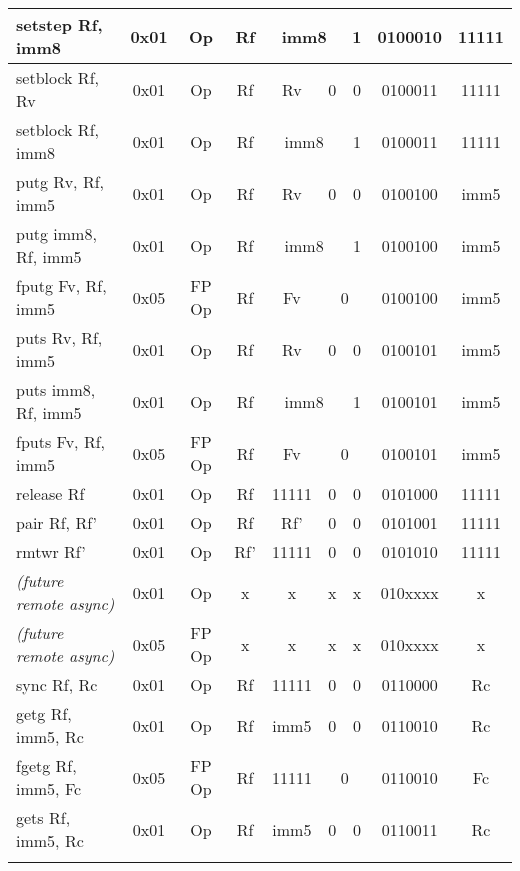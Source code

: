 \documentclass[a4paper,11pt]{article}
\begin{document}
\begin{table}
\begin{center}
{\begin{tabular}{|>{\ttfamily}l||c|c|c|c|c|c|c|c|}
setstep  Rf, imm8       & 0x01 & Op     & Rf & \multicolumn{2}{c|}{imm8} & 1 & 0100010 & 11111 \\ \cline{5-6}
setblock Rf, Rv         & 0x01 & Op     & Rf &                    Rv & 0 & 0 & 0100011 & 11111 \\ \cline{5-6}
setblock Rf, imm8       & 0x01 & Op     & Rf & \multicolumn{2}{c|}{imm8} & 1 & 0100011 & 11111 \\ \cline{5-6}
putg Rv, Rf, imm5       & 0x01 & Op     & Rf &                    Rv & 0 & 0 & 0100100 & imm5 \\ \cline{5-6}
putg imm8, Rf, imm5     & 0x01 & Op     & Rf & \multicolumn{2}{c|}{imm8} & 1 & 0100100 & imm5 \\ \cline{5-7}
fputg Fv, Rf, imm5      & 0x05 & FP Op  & Rf & Fv & \multicolumn{2}{c|}{0} & 0100100 & imm5 \\ \cline{5-7}
puts Rv, Rf, imm5       & 0x01 & Op     & Rf &                    Rv & 0 & 0 & 0100101 & imm5 \\ \cline{5-6}
puts imm8, Rf, imm5     & 0x01 & Op     & Rf & \multicolumn{2}{c|}{imm8} & 1 & 0100101 & imm5 \\ \cline{5-7}
fputs Fv, Rf, imm5      & 0x05 & FP Op  & Rf & Fv & \multicolumn{2}{c|}{0} & 0100101 & imm5 \\ \cline{6-7}
release  Rf             & 0x01 & Op     & Rf &                    11111 & 0 & 0 & 0101000 & 11111 \\
pair  Rf, Rf'             & 0x01 & Op     & Rf &                    Rf'     & 0 & 0 & 0101001 & 11111 \\
rmtwr  Rf'               & 0x01 & Op     & Rf' &                    11111 & 0 & 0 & 0101010 & 11111 \\
\hline\hline
\normalfont \emph{(future remote async)} & 0x01 & Op & x & x & x & x & 010xxxx & x \\
\normalfont \emph{(future remote async)} & 0x05 & FP Op & x & x & x & x & 010xxxx & x \\
\hline \hline
sync Rf, Rc             & 0x01 & Op     & Rf &                    11111 & 0 & 0 & 0110000 & Rc \\
getg Rf, imm5, Rc       & 0x01 & Op     & Rf &                  imm5 & 0 & 0 & 0110010 & Rc \\ \cline{6-7}
fgetg  Rf, imm5, Fc     & 0x05 & FP Op  & Rf & 11111 & \multicolumn{2}{c|}{0} &   0110010 & Fc \\ \cline{6-7}
gets Rf, imm5, Rc       & 0x01 & Op     & Rf &                  imm5 & 0 & 0 & 0110011 & Rc \\ \cline{6-7}

\end{tabular}}
\end{center}
\end{table}
\end{document}
